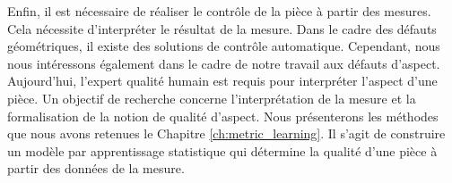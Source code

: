 Enfin, il est nécessaire de réaliser le contrôle de la pièce à partir des mesures.
Cela nécessite d'interpréter le résultat de la mesure.
Dans le cadre des défauts géométriques, il existe des solutions de contrôle automatique.
Cependant, nous nous intéressons également dans le cadre de notre travail aux défauts d'aspect.
Aujourd'hui, l'expert qualité humain est requis pour interpréter l'aspect d'une pièce.
Un objectif de recherche concerne l'interprétation de la mesure et la formalisation de la notion de qualité d'aspect.
Nous présenterons les méthodes que nous avons retenues le Chapitre \ref{ch:metric_learning}.
Il s'agit de construire un modèle par apprentissage statistique qui détermine la qualité d'une pièce à partir des données de la mesure.
